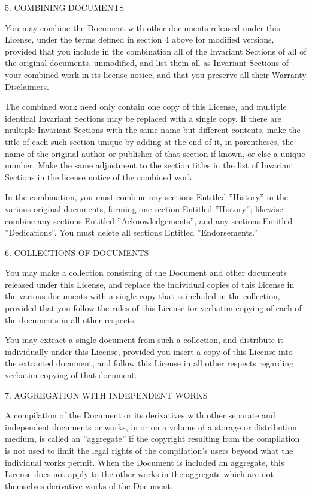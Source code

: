 5. COMBINING DOCUMENTS

You may combine the Document with other documents released under this License, under the terms defined in section 4
above for modified versions, provided that you include in the combination all of the Invariant Sections of all of the
original documents, unmodified, and list them all as Invariant Sections of your combined work in its license notice,
and that you preserve all their Warranty Disclaimers.

The combined work need only contain one copy of this License, and multiple identical Invariant Sections may be replaced
with a single copy. If there are multiple Invariant Sections with the same name but different contents, make the title
of each such section unique by adding at the end of it, in parentheses, the name of the original author or publisher of
that section if known, or else a unique number. Make the same adjustment to the section titles in the list of Invariant
Sections in the license notice of the combined work.

In the combination, you must combine any sections Entitled ''History'' in the various original documents, forming one
section Entitled ''History''; likewise combine any sections Entitled ''Acknowledgements'', and any sections Entitled
''Dedications''. You must delete all sections Entitled ''Endorsements.''

6. COLLECTIONS OF DOCUMENTS

You may make a collection consisting of the Document and other documents released under this License, and replace the
individual copies of this License in the various documents with a single copy that is included in the collection,
provided that you follow the rules of this License for verbatim copying of each of the documents in all other respects.

You may extract a single document from such a collection, and distribute it individually under this License, provided
you insert a copy of this License into the extracted document, and follow this License in all other respects regarding
verbatim copying of that document.

7. AGGREGATION WITH INDEPENDENT WORKS

A compilation of the Document or its derivatives with other separate and independent documents or works, in or on a
volume of a storage or distribution medium, is called an ''aggregate'' if the copyright resulting from the compilation
is not used to limit the legal rights of the compilation's users beyond what the individual works permit. When the
Document is included an aggregate, this License does not apply to the other works in the aggregate which are not
themselves derivative works of the Document.

